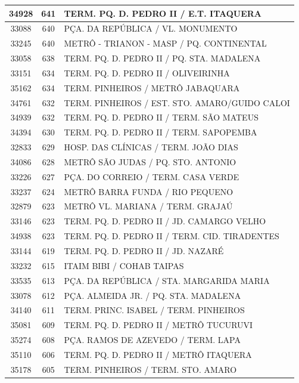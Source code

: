 \documentclass[
	12pt,				%
	oneside,			%
	a4paper,			%
	english,			%
	brazil				%
	]{abntex2ppgsi}
\begin{document}
{{{\begin{apendicesenv}
\begin{longtable}{c|c|p{7cm}}
 \hline 
34928 &	641 &	TERM. PQ. D. PEDRO II / E.T. ITAQUERA \\ 
 \hline 
33088 &	640 &	PÇA. DA REPÚBLICA / VL. MONUMENTO \\ 
 \hline 
33245 &	640 &	METRÔ - TRIANON - MASP / PQ. CONTINENTAL \\ 
 \hline 
33058 &	638 &	TERM. PQ. D. PEDRO II / PQ. STA. MADALENA \\ 
 \hline 
33151 &	634 &	TERM. PQ. D. PEDRO II / OLIVEIRINHA \\ 
 \hline 
35162 &	634 &	TERM. PINHEIROS / METRÔ JABAQUARA \\ 
 \hline 
34761 &	632 &	TERM. PINHEIROS / EST. STO. AMARO/GUIDO CALOI \\ 
 \hline 
34939 &	632 &	TERM. PQ. D. PEDRO II / TERM. SÃO MATEUS \\ 
 \hline 
34394 &	630 &	TERM. PQ. D. PEDRO II / TERM. SAPOPEMBA \\ 
 \hline 
32833 &	629 &	HOSP. DAS CLÍNICAS / TERM. JOÃO DIAS \\ 
 \hline 
34086 &	628 &	METRÔ SÃO JUDAS / PQ. STO. ANTONIO \\ 
 \hline 
33226 &	627 &	PÇA. DO CORREIO / TERM. CASA VERDE \\ 
 \hline 
33237 &	624 &	METRÔ BARRA FUNDA / RIO PEQUENO \\ 
 \hline 
32879 &	623 &	METRÔ VL. MARIANA / TERM. GRAJAÚ \\ 
 \hline 
33146 &	623 &	TERM. PQ. D. PEDRO II / JD. CAMARGO VELHO \\ 
 \hline 
34938 &	623 &	TERM. PQ. D. PEDRO II / TERM. CID. TIRADENTES \\ 
 \hline 
33144 &	619 &	TERM. PQ. D. PEDRO II / JD. NAZARÉ \\ 
 \hline 
33232 &	615 &	ITAIM BIBI / COHAB TAIPAS \\ 
 \hline 
33535 &	613 &	PÇA. DA REPÚBLICA / STA. MARGARIDA MARIA \\ 
 \hline 
33078 &	612 &	PÇA. ALMEIDA JR. / PQ. STA. MADALENA \\ 
 \hline 
34140 &	611 &	TERM. PRINC. ISABEL / TERM. PINHEIROS \\ 
 \hline 
35081 &	609 &	TERM. PQ. D. PEDRO II / METRÔ TUCURUVI \\ 
 \hline 
35274 &	608 &	PÇA. RAMOS DE AZEVEDO / TERM. LAPA \\ 
 \hline 
35110 &	606 &	TERM. PQ. D. PEDRO II / METRÔ ITAQUERA \\ 
 \hline 
35178 &	605 &	TERM. PINHEIROS / TERM. STO. AMARO \\ 

\end{longtable}
\end{apendicesenv}}}}
\end{document}
